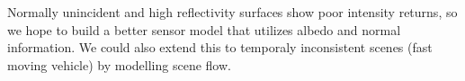Normally unincident and high reflectivity surfaces show poor intensity returns, so we hope to build a better sensor model that utilizes albedo and normal information. We could also extend this to temporaly inconsistent scenes (fast moving vehicle) by modelling scene flow.

